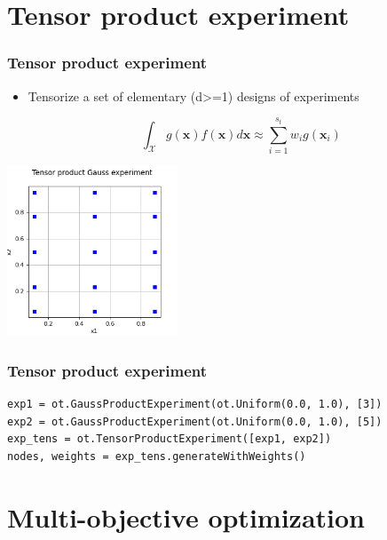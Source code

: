 \documentclass[aspectratio=169]{beamer}
\begin{document}
\section{Tensor product experiment}

\begin{frame}[containsverbatim]
\frametitle{Tensor product experiment}

\begin{itemize}
\item Tensorize a set of elementary (d>=1) designs of experiments

$$
\int_{\mathcal{X}} g(\boldsymbol{x}) f(\boldsymbol{x}) d\boldsymbol{x} 
    \approx \sum_{i = 1}^{s_t} w_i g\left(\boldsymbol{x}_i\right)
$$

\end{itemize}


\begin{center}
\includegraphics[width=0.38\textwidth]{figures/TensorProductExperiment.png}
\end{center}
\end{frame}


\begin{frame}[containsverbatim]
\frametitle{Tensor product experiment}


\lstset{language=python}
\begin{lstlisting}
exp1 = ot.GaussProductExperiment(ot.Uniform(0.0, 1.0), [3])
exp2 = ot.GaussProductExperiment(ot.Uniform(0.0, 1.0), [5])
exp_tens = ot.TensorProductExperiment([exp1, exp2])
nodes, weights = exp_tens.generateWithWeights()
\end{lstlisting}

\end{frame}


\section{Multi-objective optimization}
\end{document}
